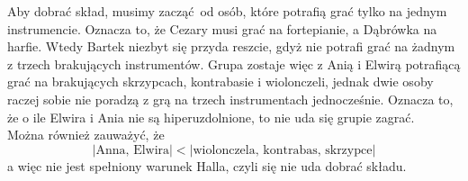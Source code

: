 \documentclass[a4paper,12pt]{article}
\newcommand{\abs}[1]{\left| #1 \right|}					%
\begin{document}
\noindent Aby dobrać skład, musimy zacząć od osób, które potrafią grać tylko na
jednym instrumencie. Oznacza to, że Cezary musi grać na fortepianie, a Dąbrówka
na harfie. Wtedy Bartek niezbyt się przyda reszcie, gdyż nie potrafi grać na
żadnym z trzech brakujących instrumentów. Grupa zostaje więc z Anią i Elwirą
potrafiącą grać na brakujących skrzypcach, kontrabasie i wiolonczeli, jednak 
dwie osoby raczej sobie nie poradzą z grą na trzech instrumentach jednocześnie.
Oznacza to, że o ile Elwira i Ania nie są hiperuzdolnione, to nie uda się grupie
zagrać. \\

\noindent Można również zauważyć, że 
\[
    \abs{\text{Anna, Elwira}} < \abs{\text{wiolonczela, kontrabas, skrzypce}} 
\]
a więc nie jest spełniony warunek Halla, czyli się nie uda dobrać składu.
\end{document}
